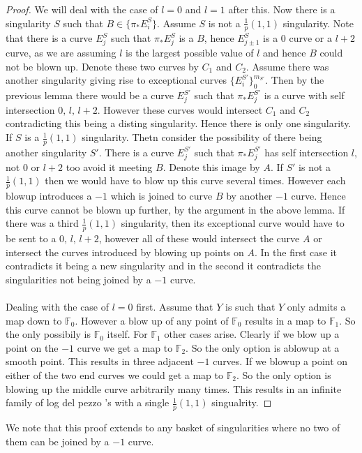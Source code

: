 \documentclass[11pt]{report}
\theoremstyle{definition}
\theoremstyle{definition}
\theoremstyle{definition}
\theoremstyle{definition}
\theoremstyle{definition}
\theoremstyle{definition}
\theoremstyle{definition}
\theoremstyle{definition}
\newcommand{\ldp}{log del pezzo }
\newcommand{\mb}[1]{\mathbb{#1}}
\begin{document}
\begin{proof}
We will deal with the case of $l = 0$ and $l = 1$ after this. Now there is a singularity $S$ such that $B \in \{ \pi_*E_i^S \}$. Assume $S$ is not a $\frac{1}{p}(1,1)$ singularity. Note that there is a curve $E_j^S$ such that $\pi_* E_j^S$ is a $B$, hence $E_{j\pm 1}^S$ is a $0$ curve or a $l+2$ curve, as we are assuming $l$ is the largest possible value of $l$ and hence $B$ could not be blown up. Denote these two curves by $C_1$ and $C_2$. Assume there was another singularity giving rise to exceptional curves $\{ E_i^{S'} \}_{0}^{m_{S'}} $. Then by the previous lemma there would be a curve $E_j^{S'}$ such that $\pi_* E_j^{S'}$ is a curve with self intersection $0, \,  l,\,  l+2$. However these curves would intersect $C_1$ and $C_2$ contradicting this being a disting singularity. Hence there is only one singularity. If $S$ is a $\frac{1}{p}(1,1)$ singularity. Thetn consider the possibility of there being another singularity $S'$. There is a curve $E_j^{S'}$ such that $\pi_* E_j^{S'}$ has self intersection $l$, not $0$ or $l+2$ too avoid it meeting $B$. Denote this image by $A$. If $S'$ is not a $\frac{1}{p}(1,1)$ then we would have to blow up this curve several times. However each blowup introduces a $-1$ which is joined to curve $B$ by another $-1$ curve. Hence this curve cannot be blown up further, by the argument in the above lemma. If there was a third $\frac{1}{p}(1,1)$ singularity, then its exceptional curve would have to be sent to a $0, \, l, \, l+2$, however all of these would intersect the curve $A$ or intersect the curves introduced by blowing up points on $A$. In the first case it contradicts it being a new singularity and in the second it contradicts the singularities not being joined by a $-1$ curve.
\\
\\
Dealing with the case of $l = 0$ first. Assume that $Y$ is such that $Y$ only admits a map down to $\mb{F}_0$. However a blow up of any point of $\mb{F}_0$ results in a map to $\mb{F}_1$. So the only possibily is $\mb{F}_0$ itself. For $\mb{F}_1$ other cases arise. Clearly if we blow up a point on the $-1$ curve we get a map to $\mb{F}_2$. So the only option is ablowup at a smooth point. This results in three adjacent $-1$ curves. If we blowup a point on either of the two end curves we could get a map to $\mb{F}_2$. So the only option is blowing up the middle curve arbitrarily many times. This results in an infinite family of \ldp's with a single $\frac{1}{p}(1,1)$ singualrity.
\end{proof}
We note that this proof extends to any basket of singularities where no two of them can be joined by a $-1$ curve.
\end{document}
